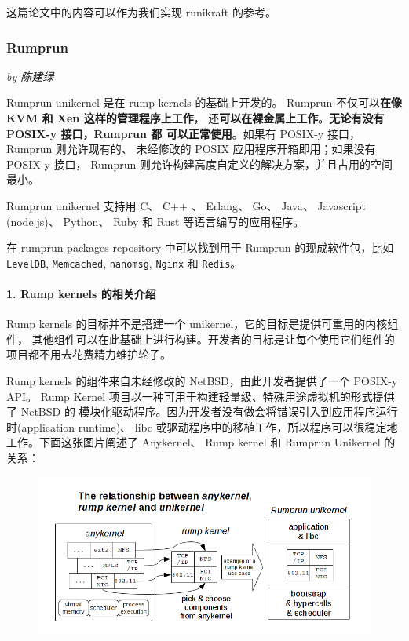 \documentclass[UTF8,fontset=none,linespread=1.15]{ctexart}
\let\nosupcite\cite
\renewcommand*{\cite}[1]{\textsuperscript{\nosupcite{#1}}}
\newcommand{\sectionauthor}[1]{%
\vspace*{-5ex}
\noindent\textrm{\hfill\textit{by #1}}
\vspace*{2ex}\par}
\begin{document}
这篇论文中的内容可以作为我们实现 runikraft 的参考。

\subsubsection{Rumprun}\sectionauthor{陈建绿}

Rumprun unikernel 是在 rump kernels 的基础上开发的。
Rumprun 不仅可以\textbf{在像 KVM 和 Xen 这样的管理程序上工作}，
还\textbf{可以在裸金属上工作}。\textbf{无论有没有 POSIX-y 接口，Rumprun 都
可以正常使用}。如果有 POSIX-y 接口，Rumprun 则允许现有的、
未经修改的 POSIX 应用程序开箱即用；如果没有 POSIX-y 接口，
Rumprun 则允许构建高度自定义的解决方案，并且占用的空间最小。

Rumprun unikernel 支持用 C、 C++ 、 Erlang、 Go、
Java、 Javascript (node.js)、 Python、 Ruby 和 Rust 等语言编写的应用程序。

在 \href{https://github.com/rumpkernel/rumprun-packages}{rumprun-packages repository}
中可以找到用于 Rumprun 的现成软件包，比如 \texttt{LevelDB},
\texttt{Memcached}, \texttt{nanomsg}, \texttt{Nginx} 和 \texttt{Redis}。

\paragraph{1. Rump kernels 的相关介绍}\cite{bib:21-rump-kernel}\cite{bib:22-xen}

Rump kernels 的目标并不是搭建一个 unikernel，它的目标是提供可重用的内核组件，
其他组件可以在此基础上进行构建。开发者的目标是让每个使用它们组件的项目都不用去花费精力维护轮子。

Rump kernels 的组件来自未经修改的 NetBSD，由此开发者提供了一个 POSIX-y API。
Rump Kernel 项目以一种可用于构建轻量级、特殊用途虚拟机的形式提供了 NetBSD 的
模块化驱动程序。因为开发者没有做会将错误引入到应用程序运行时(application runtime)、
libc 或驱动程序中的移植工作，所以程序可以很稳定地工作。下面这张图片阐述了 Anykernel、
Rump kernel 和 Rumprun Unikernel 的关系：
\begin{figure}[H]
\includegraphics[width=\linewidth]{pictures/rumprun-1.png}
\caption{}
\end{figure}
\end{document}
